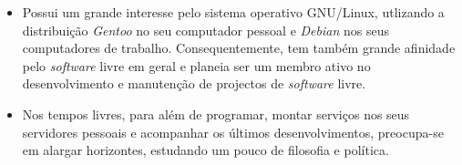 \documentclass[11pt,a4paper,sans]{moderncv} %
\begin{document}
\begin{itemize}

\item{Possui um grande interesse pelo sistema operativo GNU/Linux, utlizando a
    distribuição \textit{Gentoo} no seu computador pessoal e \textit{Debian} nos
    seus computadores de trabalho.  Consequentemente, tem também grande
    afinidade pelo \textit{software} livre em geral e planeia ser um membro
    ativo no desenvolvimento e manutenção de projectos de \textit{software}
    livre.}

\vspace{6pt}

\item{Nos tempos livres, para além de programar, montar serviços nos seus
    servidores pessoais e acompanhar os últimos desenvolvimentos, preocupa-se em
    alargar horizontes, estudando um pouco de filosofia e política.}

\end{itemize}


\nocite{*}



\end{document}
